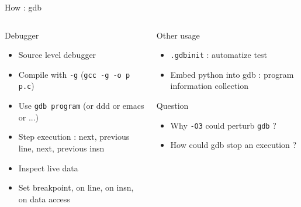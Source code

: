 %
\begin{Frame}{How : gdb}
  \begin{columns}[t]
    \begin{column}{5cm} %
      \begin{block}{Debugger}
        \begin{itemize}
        \item Source level debugger
        \item Compile with \texttt{-g} (\texttt{gcc -g -o p p.c})
        \item Use \texttt{gdb program} (or ddd or emacs or ...)
        \item Step execution : next, previous line, next, previous insn
        \item Inspect live data
        \item Set breakpoint, on line, on insn, on data access
        \end{itemize}
      \end{block} 
    \end{column}
    
    \begin{column}{5cm} %
      \begin{block}{Other usage}
        \begin{itemize}
        \item \texttt{.gdbinit} : automatize test
        \item Embed python into gdb : program information collection
        \end{itemize}
      \end{block}   
      \begin{alertblock}{Question}
        \begin{itemize}
        \item Why \texttt{-O3} could perturb \texttt{gdb} ?
        \item How could gdb stop an execution ?
        \end{itemize}
      \end{alertblock}
    \end{column}
  \end{columns}  
\end{Frame}



